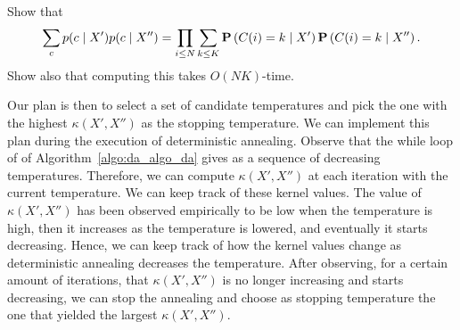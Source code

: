 \begin{exercise}
Show that
%
\begin{equation}
\sum_{c}p(c \mid X') p(c \mid X'') = \prod_{i \leq N}\sum_{k \leq K}\mathbf{P}\left(C(i) = k \mid X'\right)\mathbf{P}\left(C(i) = k \mid X''\right).
\end{equation}
%
Show also that computing this takes $O(NK)$-time.
\end{exercise}

Our plan is then to select a set of candidate temperatures and pick the
one with the highest $\kappa(X', X'')$ as the stopping temperature. We can implement
this plan during the execution of deterministic annealing. Observe
that the while loop of of Algorithm~\ref{algo:da_algo_da} gives as a sequence of decreasing
temperatures. Therefore, we can compute $\kappa(X', X'')$ at each iteration
with the current temperature. We can keep track of these kernel values.
The value of $\kappa(X', X'')$ has been observed empirically to be low when the
temperature is high, then it increases as the temperature is lowered, and
eventually it starts decreasing. Hence, we can keep track of how the kernel
values change as deterministic annealing decreases the temperature. After
observing, for a certain amount of iterations, that $\kappa(X', X'')$ is no longer
increasing and starts decreasing, we can stop the annealing and choose as
stopping temperature the one that yielded the largest $\kappa(X', X'')$.